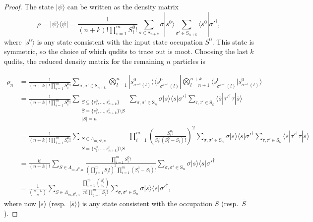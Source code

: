 \begin{proof}
The state $|\psi\rangle$ can be written as the density matrix
\begin{equation}
\rho = |\psi\rangle\langle\psi| = \frac{1}{(n+k)!\prod_{i=1}^m S^0_i!} \sum_{\sigma\in\textrm{S}_{n+k}}\sigma|s^0\rangle\sum_{\sigma'\in\textrm{S}_{n+k}}\langle s^0|\sigma'^\dagger,
\end{equation}
where $|s^0\rangle$ is any state consistent with the input state occupation $S^0$.
This state is symmetric, so the choice of which qudits to trace out is moot.
Choosing the last $k$ qudits, the reduced density matrix for the remaining $n$ particles is

\begin{align}
\rho_n
 &= \frac{1}{(n+k)!\prod_{i=1}^m S^0_i!}\sum_{\sigma,\sigma'\in\textrm{S}_{n+k}}\bigotimes_{l=1}^n|s^0_{\sigma^{-1}(l)}\rangle\langle s^0_{\sigma'^{-1}(l)}|\bigotimes_{l=n+1}^{n+k}\langle s^0_{\sigma'^{-1}(l)}|s^0_{\sigma^{-1}(l)}\rangle\label{eqn:losstrace}\\
 &=\frac{1}{(n+k)!\prod_{i=1}^m S^0_i!}\sum_{\substack{S \subseteq \{s^0_1,\dots,s^0_{n+k}\}\\\bar{S}=\{s^0_1,\dots,s^0_{n+k}\}\setminus{S}\\|S|=n}}\sum_{\sigma, \sigma' \in \textrm{S}_{n}}\sigma|s\rangle\langle s|\sigma'^\dagger\sum_{\tau,\tau'\in\textrm{S}_k}\langle \bar{s}|\tau'^\dagger\tau|\bar{s}\rangle\label{eqn:firstloss}\\
 &=\frac{1}{(n+k)!\prod_{i=1}^m S^0_i!}\sum_{\substack{S \in \Lambda_{m,S^0,n}\\\bar{S}=\{s^0_1,\dots,s^0_{n+k}\}\setminus{S}}}\prod_{i=1}^m\left(\frac{S^0_i!}{S_i!(S_i^0-S_i)!}\right)^2\sum_{\sigma, \sigma' \in \textrm{S}_{n}}\sigma|s\rangle\langle s|\sigma'^\dagger\sum_{\tau,\tau'\in\textrm{S}_k}\langle \bar{s}|\tau'^\dagger\tau|\bar{s}\rangle\label{eqn:secondloss}\\
 &=\frac{k!}{(n+k)!}\sum_{S \in \Lambda_{m,S^0,n}}\frac{\prod_{i=1}^m S^0_i!}{(\prod_{j=1}^m S_j!)^2\prod_{i=1}^m (S^0_i-S_i)!}\sum_{\sigma, \sigma' \in \textrm{S}_{n}}\sigma|s\rangle\langle s|\sigma'^\dagger\label{eqn:thirdloss}\\
 &=\frac{1}{\binom{n+k}{n}}\sum_{S \in \Lambda_{m,S^0,n}}\frac{\prod_{i=1}^m \binom{S_i^0}{S_i}}{n!\prod_{j=1}^m S_j!}\sum_{\sigma, \sigma' \in \textrm{S}_{n}}\sigma|s\rangle\langle s|\sigma'^\dagger , \label{eq:lastloss}
\end{align}
where now $|s\rangle$ (resp.\ $|\bar{s}\rangle$) is any state consistent with the occupation $S$ (resp.\ $\bar{S}$). 

\end{proof}
